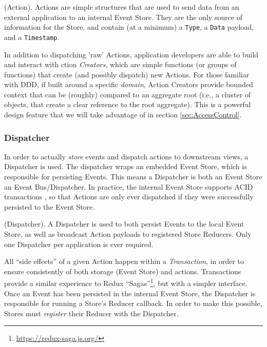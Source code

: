 \documentclass{textile}
\begin{document}
\begin{definition}
  (Action). Actions are simple structures that are used to send data from an external application to an internal Event Store. They are the only source of information for the Store, and contain (at a minimum) a \textnormal{\texttt{Type}}, a \textnormal{\texttt{Data}} payload, and a \textnormal{\texttt{Timestamp}}. 
\end{definition}

In addition to dispatching 'raw' Actions, application developers are able to build and interact with ction \emph{Creators}, which are simple functions (or groups of functions) that create (and possibly dispatch) new Actions. For those familiar with DDD, if built around a specific \emph{domain}, Action Creators provide bounded context that can be (roughly) compared to an aggregate root (i.e., a cluster of objects, that create a clear reference to the root aggregate). This is a powerful design feature that we will take advantage of in section \ref{sec:AccessControl}.

\subsubsection{Dispatcher}\label{sec:dispatcher}

In order to actually \emph{store} events and dispatch actions to downstream views, a Dispatcher is used. The dispatcher wraps an embedded Event Store, which is responsible for persisting Events. This means a Dispatcher is both an Event Store an Event Bus/Dispatcher. In practice, the internal Event Store supports ACID transactions \cite{haerderPrinciplesTransactionorientedDatabase1983}, so that Actions are only ever dispatched if they were successfully persisted to the Event Store.

\begin{definition}
  (Dispatcher). A Dispatcher is used to both persist Events to the local Event Store, as well as broadcast Action payloads to registered Store Reducers. Only one Dispatcher per application is ever required.
\end{definition}

All ``side effects'' of a given Action happen within a \emph{Transaction}, in order to ensure consistently of both storage (Event Store) and actions. Transactions provide a similar experience to Redux ``Sagas''\footnote{\url{https://redux-saga.js.org/}}, but with a simpler interface. Once an Event has been persisted in the internal Event Store, the Dispatcher is responsible for running a Store's Reducer callback. In order to make this possible, Stores must \emph{register} their Reducer with the Dispatcher.
\end{document}
